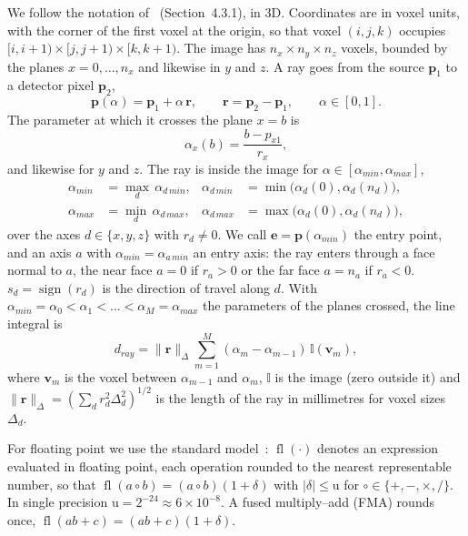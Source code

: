 \documentclass[11pt,a4paper]{article}
\theoremstyle{remark}
\newcommand{\I}{\mathbb{I}}
\newcommand{\fl}{\operatorname{fl}}
\newcommand{\eps}{\mathrm{u}}
\newcommand{\e}{\mathbf{e}}
\begin{document}
We follow the notation of~\cite{biguri2017} (Section~4.3.1), in 3D. Coordinates are in voxel units,
with the corner of the first voxel at the origin, so that voxel $(i,j,k)$ occupies
$[i,i+1)\times[j,j+1)\times[k,k+1)$. The image has $n_x\times n_y\times n_z$ voxels, bounded by the
planes $x=0,\dots,n_x$ and likewise in $y$ and $z$. A ray goes from the source $\mathbf{p}_1$ to a
detector pixel $\mathbf{p}_2$,
\begin{equation}
\mathbf{p}(\alpha)=\mathbf{p}_1+\alpha\,\mathbf{r},\qquad \mathbf{r}=\mathbf{p}_2-\mathbf{p}_1,
\qquad \alpha\in[0,1]. \label{eq:ray}
\end{equation}
The parameter at which it crosses the plane $x=b$ is
\begin{equation}
\alpha_x(b)=\frac{b-p_{x1}}{r_x}, \label{eq:alphax}
\end{equation}
and likewise for $y$ and $z$. The ray is inside the image for $\alpha\in[\alpha_{min},\alpha_{max}]$,
\begin{equation}
\begin{aligned}
\alpha_{min}&=\max_{d}\,\alpha_{d\,min}, & \alpha_{d\,min}&=\min\big(\alpha_d(0),\alpha_d(n_d)\big),\\
\alpha_{max}&=\min_{d}\,\alpha_{d\,max}, & \alpha_{d\,max}&=\max\big(\alpha_d(0),\alpha_d(n_d)\big),
\end{aligned}\label{eq:minmax}
\end{equation}
over the axes $d\in\{x,y,z\}$ with $r_d\neq0$. We call $\e=\mathbf{p}(\alpha_{min})$ the entry point,
and an axis $a$ with $\alpha_{min}=\alpha_{a\,min}$ an entry axis: the ray enters through a face normal to
$a$, the near face $a=0$ if $r_a>0$ or the far face $a=n_a$ if $r_a<0$. $s_d=\operatorname{sign}(r_d)$ is
the direction of travel along $d$. With $\alpha_{min}=\alpha_0<\alpha_1<\dots<\alpha_M=\alpha_{max}$ the
parameters of the planes crossed, the line integral is
\begin{equation}
d_{ray}=\|\mathbf{r}\|_{\Delta}\sum_{m=1}^{M}(\alpha_m-\alpha_{m-1})\,\I(\mathbf{v}_m),
\label{eq:sum}
\end{equation}
where $\mathbf{v}_m$ is the voxel between $\alpha_{m-1}$ and $\alpha_m$, $\I$ is the image (zero
outside it) and $\|\mathbf{r}\|_\Delta=(\sum_d r_d^2\Delta_d^2)^{1/2}$ is the length of the ray in
millimetres for voxel sizes $\Delta_d$.

For floating point we use the standard model~\cite{higham2002}: $\fl(\cdot)$ denotes an expression
evaluated in floating point, each operation rounded to the nearest representable number, so that
$\fl(a\circ b)=(a\circ b)(1+\delta)$ with $|\delta|\le\eps$ for $\circ\in\{+,-,\times,/\}$. In single
precision $\eps=2^{-24}\approx6\times10^{-8}$. A fused multiply--add (FMA) rounds once,
$\fl(ab+c)=(ab+c)(1+\delta)$.
\end{document}

